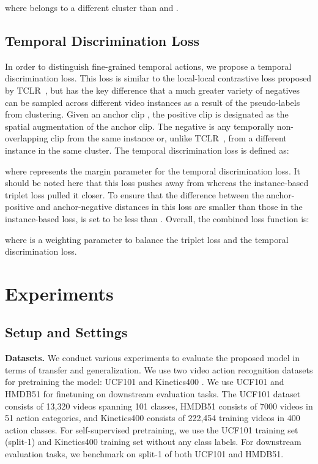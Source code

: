 \documentclass[10pt,twocolumn,letterpaper]{article}
\begin{document}
where  belongs to a different cluster than  and .

\subsection{Temporal Discrimination Loss}
\vspace{-0.1cm}

In order to distinguish fine-grained temporal actions, we propose a temporal discrimination loss. This loss is similar to the local-local contrastive loss proposed by TCLR~\cite{dave2021tclr}, but has the key difference that a much greater variety of negatives can be sampled across different video instances as a result of the pseudo-labels from clustering. Given an anchor clip , the positive clip is designated as the spatial augmentation  of the anchor clip. The negative is any temporally non-overlapping clip from the same instance or, unlike TCLR~\cite{dave2021tclr}, from a different instance in the same cluster. The temporal discrimination loss is defined as:

where  represents the margin parameter for the temporal discrimination loss. It should be noted here that this loss pushes away  from  whereas the instance-based triplet loss pulled it closer. To ensure that the difference between the anchor-positive and anchor-negative distances in this loss are smaller than those in the instance-based loss,  is set to be less than .
Overall, the combined loss function is:

where  is a weighting parameter to balance the triplet loss and the temporal discrimination loss.







\section{Experiments}


\label{experiment}
\subsection{Setup and Settings}
\label{impl_details}


\textbf{Datasets.} We conduct various experiments to evaluate the proposed model in terms of transfer and generalization. We use two video action recognition datasets for pretraining the model: UCF101 \cite{soomro2012ucf101} and Kinetics400 \cite{kay2017kinetics}. 
We use UCF101 \cite{soomro2012ucf101} and HMDB51 \cite{hmdb} for finetuning on downstream evaluation tasks. The UCF101 dataset consists of 13,320 videos spanning 101 classes, HMDB51 consists of 7000 videos in 51 action categories, and Kinetics400 consists of 222,454 training videos in 400 action classes. For self-supervised pretraining, we use the UCF101 training set (split-1) and Kinetics400 training set without any class labels. For downstream evaluation tasks, we benchmark on split-1 of both UCF101 and HMDB51.
\end{document}
